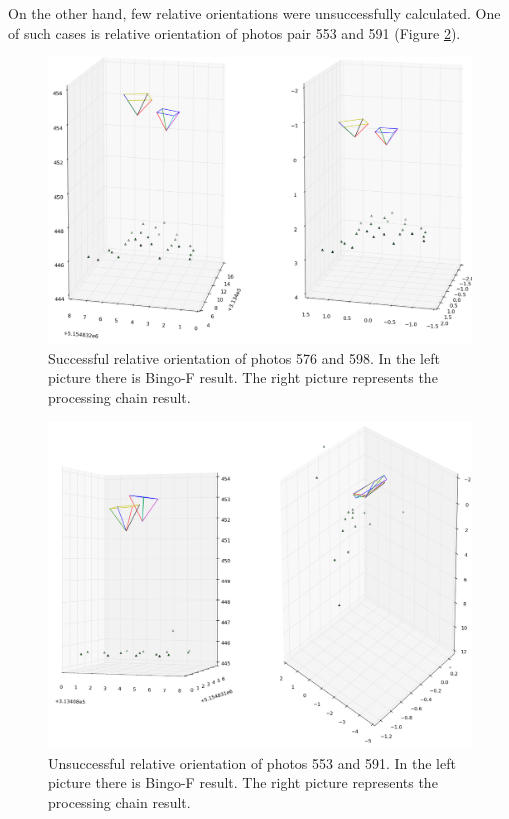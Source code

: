 \documentclass[a4paper,12pt]{article}
\begin{document}
On the other hand, few relative orientations were unsuccessfully calculated.  
One of such cases is relative orientation of photos pair 553 and 591 (Figure \ref{fig:rel_or_ok_553}).  


\begin{center}
 \begin{figure}[!h]
    \includegraphics[scale=0.4]{figures/rel_or_576_598.png}
    \caption{Successful relative orientation of photos 576 and 598. In the left picture there 
    is Bingo-F result. The right picture represents the processing chain result.}
    \label{fig:rel_or_ok}
\end{figure}
\end{center}


\begin{center}
 \begin{figure}[!h]
    \includegraphics[scale=0.4]{figures/rel_or_553_591.png}
    \caption{Unsuccessful relative orientation of photos 553 and 591. 
    In the left picture there 
    is Bingo-F result. The right picture represents the processing chain result.}
    \label{fig:rel_or_ok_553}
\end{figure}
\end{center}
\end{document}
